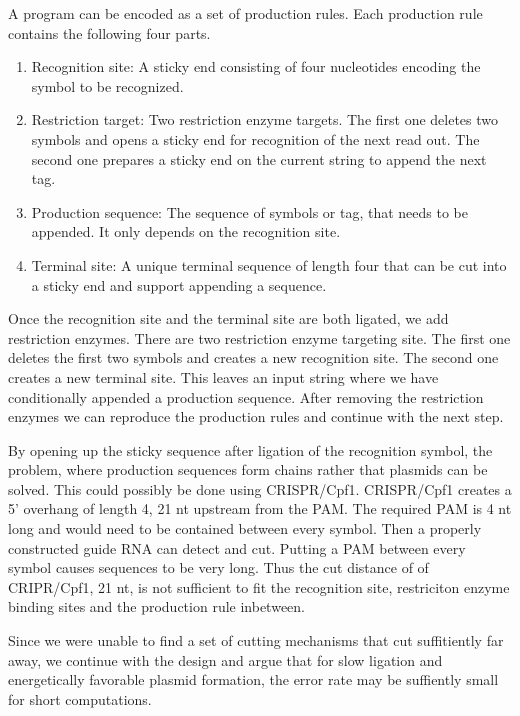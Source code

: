 \documentclass[
11pt, %
a4paper, %
oneside, %
headinclude,footinclude, %
BCOR5mm, %
]{scrartcl}
\begin{document}
A program can be encoded as a set of production rules. Each production rule
contains the following four parts.

\begin{enumerate}
  \item Recognition site: A sticky end consisting of four nucleotides encoding
    the symbol to be recognized.
  \item Restriction target: Two restriction enzyme targets. The first one
    deletes two symbols and opens a sticky end for recognition of the next
    read out. The second one prepares a sticky end on the current string to
    append the next tag.
  \item Production sequence: The sequence of symbols or tag, that needs to be
    appended. It only depends on the recognition site.
  \item Terminal site: A unique terminal sequence of length four that can be cut
    into a sticky end and support appending a sequence.
\end{enumerate}

Once the recognition site and the terminal site are both ligated, we add
restriction enzymes. There are two restriction enzyme targeting site. The first
one deletes the first two symbols and creates a new recognition site. The second
one creates a new terminal site. This leaves an input string where we have
conditionally appended a production sequence. After removing the restriction
enzymes we can reproduce the production rules and continue with the next step.

By opening up the sticky sequence after ligation of the recognition symbol, the
problem, where production sequences form chains rather that plasmids can be
solved. This could possibly be done using CRISPR/Cpf1. CRISPR/Cpf1 creates a 5'
overhang of length 4, 21 nt upstream from the PAM. The required PAM is 4 nt
long and would need to be contained between every symbol. Then a properly
constructed guide RNA can detect and cut. Putting a PAM between every symbol
causes sequences to be very long. Thus the cut distance of of CRIPR/Cpf1, 21
nt, is not sufficient to fit the recognition site, restriciton enzyme binding
sites and the production rule inbetween.

Since we were unable to find a set of cutting mechanisms that cut suffitiently
far away, we continue with the design and argue that for slow ligation and
energetically favorable plasmid formation, the error rate may be suffiently
small for short computations. 
\end{document}
